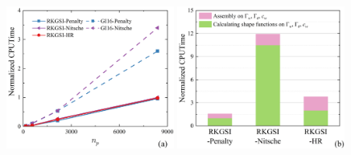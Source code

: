 \newpage
\begin{figure}[H]
    \centering
    \begin{subcaptiongroup}
    \includegraphics[width=0.49\textwidth]{figure/PHR/A/Qcputime.png}
    \label{aQcputime}
    \includegraphics[width=0.49\textwidth]{figure/PHR/A/Qefficiency.png}
    \label{aQefficiency}
    \end{subcaptiongroup}
\caption{}
\label{AQcputime}
\end{figure}
